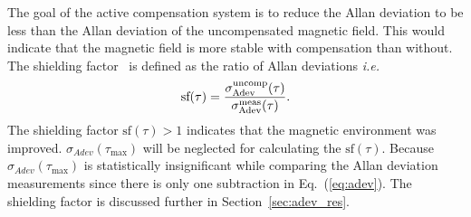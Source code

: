 




The goal of the active compensation system is to reduce the Allan deviation to be less than the Allan deviation of the uncompensated magnetic field. This would indicate that the magnetic field is more stable with compensation than without. The shielding factor~\cite{bea} is defined as the ratio of Allan deviations {\it i.e.}
\begin{equation}\label{eq:sf}
    \text{sf} (\tau)=\frac{\sigma_{\text{Adev}}^{\text{uncomp}}(\tau)}{\sigma_{\text{Adev}}^{\text{meas}}(\tau)}{\rm .}
\end{equation}
The shielding factor $\text{sf} (\tau)>1$ indicates that the magnetic environment was improved. $\sigma_{Adev}(\tau_{\text{max}})$ will be neglected for calculating the $\text{sf} (\tau)$. Because $\sigma_{Adev}(\tau_{\text{max}})$ is statistically insignificant while comparing the Allan deviation measurements since there is only one subtraction in Eq.~(\ref{eq:adev}). The shielding factor is discussed further in Section~\ref{sec:adev_res}.
 

 
 
 
